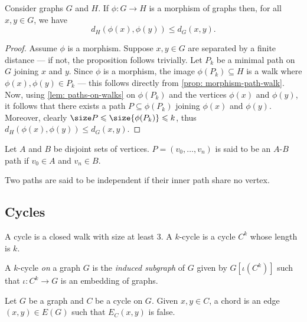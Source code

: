 \begin{corollary}
  \label{cor: morphism-cycle}
  Consider graphs \(G\) and \(H\). If \(\phi: G \to H\) is a morphism of
  graphs then, for all \(x, y \in G\), we have
  \[
    d_H(\phi(x), \phi(y)) \leq d_G(x, y).
  \]
\end{corollary}

\begin{proof}
  Assume \(\phi\) is a morphism. Suppose \(x, y \in G\) are separated by a
  finite distance --- if not, the proposition follows trivially. Let \(P_k\) be
  a minimal path on \(G\) joining \(x\) and \(y\). Since \(\phi\) is a morphism,
  the image \(\phi(P_k) \subseteq H\) is a walk where \(\phi(x), \phi(y) \in
  P_k\) --- this follows directly from \cref{prop: morphism-path-walk}. Now,
  using \cref{lem: paths-on-walks} on \(\phi(P_k)\) and the vertices \(\phi(x)\)
  and \(\phi(y)\), it follows that there exists a path \(P \subseteq \phi(P_k)\)
  joining \(\phi(x)\) and \(\phi(y)\). Moreover, clearly \(\size P \leq
  \size{\phi(P_k)} \leq k\), thus \(d_H(\phi(x), \phi(y)) \leq d_G(x, y)\).
\end{proof}

\begin{definition}\label{def: A-B-path}
  Let \(A\) and \(B\) be disjoint sets of vertices. \(P = (v_0, \dots, v_n)\) is
  said to be an \(A\)-\(B\) path if \(v_0 \in A\) and \(v_n \in B\).
\end{definition}

\begin{definition}\label{def: independent-paths}
  Two paths are said to be independent if their inner path share no vertex.
\end{definition}

\subsection{Cycles}

\begin{definition}\label{def: cycle}
  A cycle is a closed walk with size at least \(3\). A \(k\)-cycle is a cycle
  \(C^k\) whose length is \(k\).

  A \(k\)-cycle \emph{on} a graph \(G\) is the \emph{induced subgraph} of \(G\)
  given by \(G[\iota(C^k)]\) such that \(\iota: C^k \to G\) is an embedding of
  graphs.
\end{definition}

\begin{definition}[Chords]\label{def: chord}
  Let \(G\) be a graph and \(C\) be a cycle on \(G\). Given \(x, y \in C\), a
  chord is an edge \((x, y) \in E(G)\) such that \(E_C(x, y)\) is false.
\end{definition}

